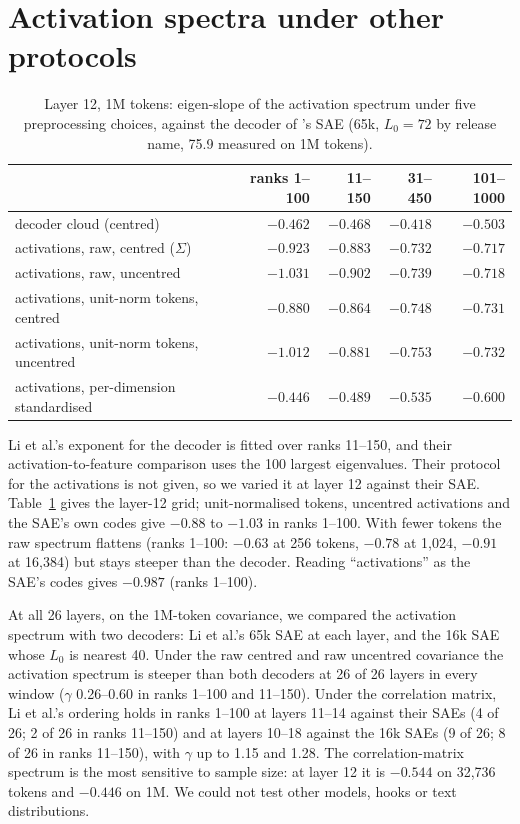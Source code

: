 \documentclass{article}
\newcommand{\Sig}{\Sigma}
\newcommand{\Lz}{L_0}
\begin{document}
\section{Activation spectra under other protocols}
\label{app:li}

\begin{table}[!htb]
\centering
\caption{Layer 12, 1M tokens: eigen-slope of the activation spectrum under five preprocessing choices, against the decoder of \citeauthor{li2025geometry}'s SAE (65k, $\Lz=72$ by release name, 75.9 measured on 1M tokens).}
\label{tab:li}
\small
\begin{tabular}{l rrrr}
\toprule
 & ranks 1--100 & 11--150 & 31--450 & 101--1000 \\
\midrule
decoder cloud (centred) & $-0.462$ & $-0.468$ & $-0.418$ & $-0.503$ \\
activations, raw, centred ($\Sig$) & $-0.923$ & $-0.883$ & $-0.732$ & $-0.717$ \\
activations, raw, uncentred & $-1.031$ & $-0.902$ & $-0.739$ & $-0.718$ \\
activations, unit-norm tokens, centred & $-0.880$ & $-0.864$ & $-0.748$ & $-0.731$ \\
activations, unit-norm tokens, uncentred & $-1.012$ & $-0.881$ & $-0.753$ & $-0.732$ \\
activations, per-dimension standardised & $-0.446$ & $-0.489$ & $-0.535$ & $-0.600$ \\
\bottomrule
\end{tabular}
\end{table}

Li et al.'s exponent for the decoder is fitted over ranks 11--150, and their activation-to-feature comparison uses the 100 largest eigenvalues. Their protocol for the activations is not given, so we varied it at layer 12 against their SAE. Table~\ref{tab:li} gives the layer-12 grid; unit-normalised tokens, uncentred activations and the SAE's own codes give $-0.88$ to $-1.03$ in ranks 1--100. With fewer tokens the raw spectrum flattens (ranks 1--100: $-0.63$ at 256 tokens, $-0.78$ at 1,024, $-0.91$ at 16,384) but stays steeper than the decoder. Reading ``activations'' as the SAE's codes gives $-0.987$ (ranks 1--100).

At all 26 layers, on the 1M-token covariance, we compared the activation spectrum with two decoders: Li et al.'s 65k SAE at each layer, and the 16k SAE whose $\Lz$ is nearest 40. Under the raw centred and raw uncentred covariance the activation spectrum is steeper than both decoders at 26 of 26 layers in every window ($\gamma$ 0.26--0.60 in ranks 1--100 and 11--150). Under the correlation matrix, Li et al.'s ordering holds in ranks 1--100 at layers 11--14 against their SAEs (4 of 26; 2 of 26 in ranks 11--150) and at layers 10--18 against the 16k SAEs (9 of 26; 8 of 26 in ranks 11--150), with $\gamma$ up to 1.15 and 1.28. The correlation-matrix spectrum is the most sensitive to sample size: at layer 12 it is $-0.544$ on 32,736 tokens and $-0.446$ on 1M. We could not test other models, hooks or text distributions.
\end{document}
